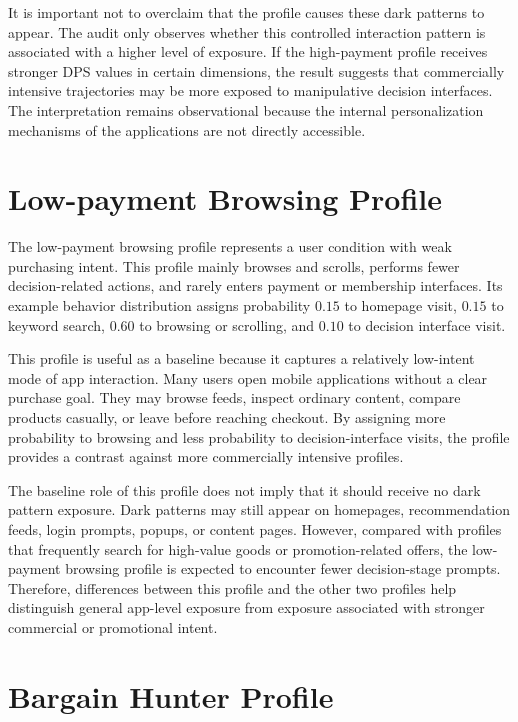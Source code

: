 It is important not to overclaim that the profile causes these dark patterns to appear. The audit only observes whether this controlled interaction pattern is associated with a higher level of exposure. If the high-payment profile receives stronger DPS values in certain dimensions, the result suggests that commercially intensive trajectories may be more exposed to manipulative decision interfaces. The interpretation remains observational because the internal personalization mechanisms of the applications are not directly accessible.

\section{Low-payment Browsing Profile}

The low-payment browsing profile represents a user condition with weak purchasing intent. This profile mainly browses and scrolls, performs fewer decision-related actions, and rarely enters payment or membership interfaces. Its example behavior distribution assigns probability \(0.15\) to homepage visit, \(0.15\) to keyword search, \(0.60\) to browsing or scrolling, and \(0.10\) to decision interface visit.

This profile is useful as a baseline because it captures a relatively low-intent mode of app interaction. Many users open mobile applications without a clear purchase goal. They may browse feeds, inspect ordinary content, compare products casually, or leave before reaching checkout. By assigning more probability to browsing and less probability to decision-interface visits, the profile provides a contrast against more commercially intensive profiles.

The baseline role of this profile does not imply that it should receive no dark pattern exposure. Dark patterns may still appear on homepages, recommendation feeds, login prompts, popups, or content pages. However, compared with profiles that frequently search for high-value goods or promotion-related offers, the low-payment browsing profile is expected to encounter fewer decision-stage prompts. Therefore, differences between this profile and the other two profiles help distinguish general app-level exposure from exposure associated with stronger commercial or promotional intent.

\section{Bargain Hunter Profile}

